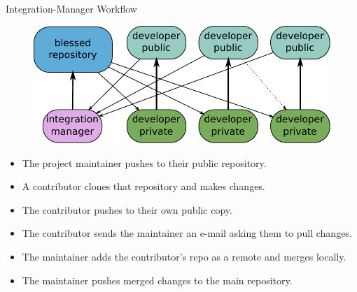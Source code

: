 \begin{frame}{Integration-Manager Workflow}
  \begin{figure} 
  \centering
    \includegraphics[scale=0.6]{images/integration-manager-workflow.pdf}
  \end{figure}
  \begin{itemize}
    \pause \item The project maintainer pushes to their public repository.
    \pause \item A contributor clones that repository and makes changes.
    \pause \item The contributor pushes to their own public copy.
    \pause \item The contributor sends the maintainer an e-mail asking them to pull changes.
    \pause \item The maintainer adds the contributor’s repo as a remote and merges locally.
    \pause \item The maintainer pushes merged changes to the main repository.
  \end{itemize}
\end{frame}

